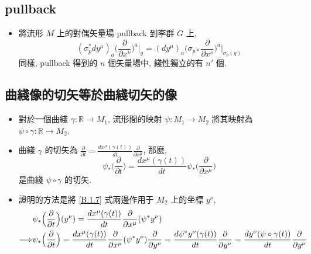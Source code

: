 \subsection{pullback}
\begin{itemize}
	\item 將流形 $M$ 上的對偶矢量場 pullback 到李群 $G$ 上,
	\begin{equation}
		(\sigma^*_p dy^\mu)_a \Big( \frac{\partial}{\partial x^\nu} \Big)^a \Big|_g = (dy^\mu)_a \Big( \sigma_{p *} \frac{\partial}{\partial x^\nu} \Big)^a \Big|_{\sigma_p(g)}
	\end{equation}
	同樣, pullback 得到的 $n$ 個矢量場中, 綫性獨立的有 $n'$ 個.
\end{itemize}

\subsection{曲綫像的切矢等於曲綫切矢的像} \label{B.1.4}
\begin{itemize}
	\item 對於一個曲綫 $\gamma : \mathbb{R} \rightarrow M_1$, 流形間的映射 $\psi : M_1 \rightarrow M_2$ 將其映射為 $\psi \circ \gamma : \mathbb{R} \rightarrow M_2$.
	
	\item 曲綫 $\gamma$ 的切矢為 $\frac{\partial}{\partial t} = \frac{d x^\mu(\gamma(t))}{dt} \frac{\partial}{\partial x^\mu}$, 那麽,
	\begin{equation} \label{B.1.7}
		\psi_* \Big( \frac{\partial}{\partial t} \Big) = \frac{d x^\mu(\gamma(t))}{dt} \psi_* \Big( \frac{\partial}{\partial x^\mu} \Big)
	\end{equation}
	是曲綫 $\psi \circ \gamma$ 的切矢.
	
	\item 證明的方法是將 \eqref{B.1.7} 式兩邊作用于 $M_2$ 上的坐標 $y^\nu$,
	\begin{align}
		& \psi_* \Big( \frac{\partial}{\partial t} \Big) (y^\nu) = \frac{d x^\mu(\gamma(t))}{dt} \frac{\partial}{\partial x^\mu} (\psi^* y^\nu) \notag \\
		\Longrightarrow & \psi_* \Big( \frac{\partial}{\partial t} \Big) = \frac{d x^\mu(\gamma(t))}{dt} \frac{\partial}{\partial x^\mu} (\psi^* y^\nu) \frac{\partial}{\partial y^\nu} = \frac{d \psi^* y^\nu(\gamma(t))}{dt} \frac{\partial}{\partial y^\nu} = \frac{d y^\nu(\psi \circ \gamma(t))}{dt} \frac{\partial}{\partial y^\nu}
	\end{align}
\end{itemize}

